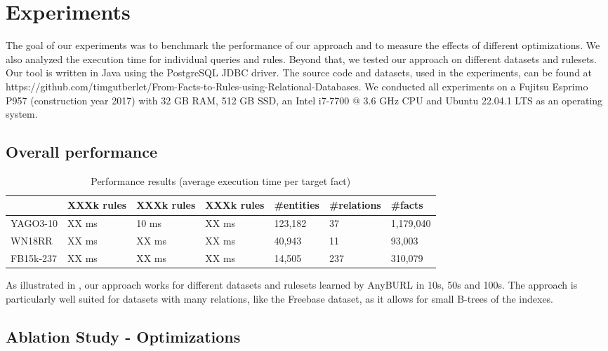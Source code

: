 \documentclass[english]{lni}
\begin{document}
\section{Experiments}
The goal of our experiments was to benchmark the performance of our approach and to measure the effects of different optimizations. We also analyzed the execution time for individual queries and rules. Beyond that, we tested our approach on different datasets and rulesets. Our tool is written in Java using the PostgreSQL JDBC driver. The source code and datasets, used in the experiments, can be found at https://github.com/timgutberlet/From-Facts-to-Rules-using-Relational-Databases. We conducted all experiments on a Fujitsu Esprimo P957 (construction year 2017) with 32 GB RAM, 512 GB SSD, an Intel i7-7700 @ 3.6 GHz CPU and Ubuntu 22.04.1 LTS as an operating system.

\subsection{Overall performance}

\begin{table}[t]
\centering
\begin{tabular}{lllllll}
\toprule
 & XXXk rules & XXXk rules  & XXXk rules & \#entities & \#relations & \#facts\\
\midrule
YAGO3-10 & XX ms & 10 ms & XX ms & 123,182 & 37 & 1,179,040\\
WN18RR & XX ms & XX ms & XX ms & 40,943 & 11 & 93,003\\
FB15k-237 & XX ms & XX ms & XX ms & 14,505 & 237 & 310,079\\
\bottomrule
\end{tabular}
\caption{Performance results (average execution time per target fact)}
\label{tab:overall}
\end{table}

As illustrated in , our approach works for different datasets and rulesets learned by AnyBURL in 10s, 50s and 100s. The approach is particularly well suited for datasets with many relations, like the Freebase dataset, as it allows for small B-trees of the indexes.

\subsection{Ablation Study - Optimizations} 
\end{document}
